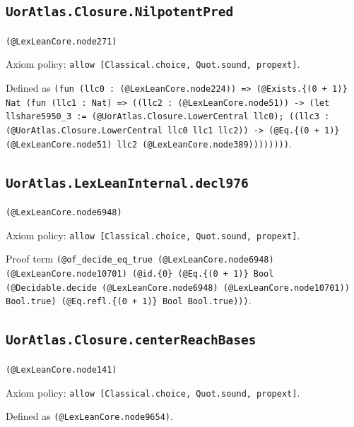 \documentclass[11pt]{article}
\begin{document}
\subsection*{\texttt{UorAtlas.Closure.NilpotentPred}}
\noindent\texttt{(@LexLeanCore.node271)}\par
\noindent Axiom policy: \texttt{allow [Classical.choice, Quot.sound, propext]}.\par
\noindent Defined as \texttt{(fun (llc0 : (@LexLeanCore.node224)) => (@Exists.\{(0 + 1)\} Nat (fun (llc1 : Nat) => ((llc2 : (@LexLeanCore.node51)) -> (let llshare5950\_3 := (@UorAtlas.Closure.LowerCentral llc0); ((llc3 : (@UorAtlas.Closure.LowerCentral llc0 llc1 llc2)) -> (@Eq.\{(0 + 1)\} (@LexLeanCore.node51) llc2 (@LexLeanCore.node389))))))))}.\par
\subsection*{\texttt{UorAtlas.LexLeanInternal.decl976}}
\noindent\texttt{(@LexLeanCore.node6948)}\par
\noindent Axiom policy: \texttt{allow [Classical.choice, Quot.sound, propext]}.\par
\noindent Proof term \texttt{(@of\_decide\_eq\_true (@LexLeanCore.node6948) (@LexLeanCore.node10701) (@id.\{0\} (@Eq.\{(0 + 1)\} Bool (@Decidable.decide (@LexLeanCore.node6948) (@LexLeanCore.node10701)) Bool.true) (@Eq.refl.\{(0 + 1)\} Bool Bool.true)))}.\par
\subsection*{\texttt{UorAtlas.Closure.centerReachBases}}
\noindent\texttt{(@LexLeanCore.node141)}\par
\noindent Axiom policy: \texttt{allow [Classical.choice, Quot.sound, propext]}.\par
\noindent Defined as \texttt{(@LexLeanCore.node9654)}.\par
\end{document}
